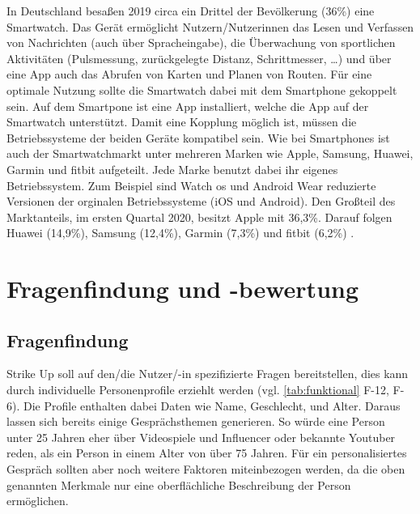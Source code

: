 In Deutschland besaßen 2019 circa ein Drittel der Bevölkerung (36\%) \cite{misc:statista_smartwatches} eine Smartwatch.
Das Gerät ermöglicht Nutzern/Nutzerinnen das Lesen und Verfassen von Nachrichten (auch über Spracheingabe), die Überwachung von sportlichen Aktivitäten
(Pulsmessung, zurückgelegte Distanz, Schrittmesser, \dots) und über eine App auch das Abrufen von Karten und Planen von Routen.
Für eine optimale Nutzung sollte die Smartwatch dabei mit dem Smartphone gekoppelt sein. Auf dem Smartpone ist eine App installiert, welche die App auf der Smartwatch unterstützt.
Damit eine Kopplung möglich ist, müssen die Betriebssysteme der beiden Geräte kompatibel sein. \newline
Wie bei Smartphones ist auch der Smartwatchmarkt unter mehreren Marken wie Apple, Samsung, Huawei, Garmin \cite{misc:garmin} und fitbit \cite{misc:fitbit} aufgeteilt.
Jede Marke benutzt dabei ihr eigenes Betriebssystem.
Zum Beispiel sind Watch \gls{os} und Android Wear reduzierte Versionen der orginalen Betriebssysteme (iOS und Android). \newline
Den Großteil des Marktanteils, im ersten Quartal 2020, besitzt Apple mit 36,3\%. Darauf folgen Huawei (14,9\%), Samsung (12,4\%), Garmin (7,3\%) und fitbit (6,2\%) \cite{misc:canalys_smartwatch_marketshare}.


\section{Fragenfindung und -bewertung}
\label{sec:fragenfindungbewertung}

\subsection{Fragenfindung}
\label{subsec:fragenfindung}

Strike Up soll auf den/die Nutzer/-in spezifizierte Fragen bereitstellen, dies kann durch individuelle Personenprofile erziehlt werden (vgl. \ref{tab:funktional} F-12, F-6).
Die Profile enthalten dabei Daten wie Name, Geschlecht, und Alter. Daraus lassen sich bereits einige Gesprächsthemen generieren. So würde eine Person unter 25 Jahren eher über Videospiele
und Influencer oder bekannte Youtuber reden, als ein Person in einem Alter von über 75 Jahren. \newline
Für ein personalisiertes Gespräch sollten aber noch weitere Faktoren miteinbezogen werden, da die oben genannten Merkmale nur eine oberflächliche Beschreibung der Person ermöglichen.

